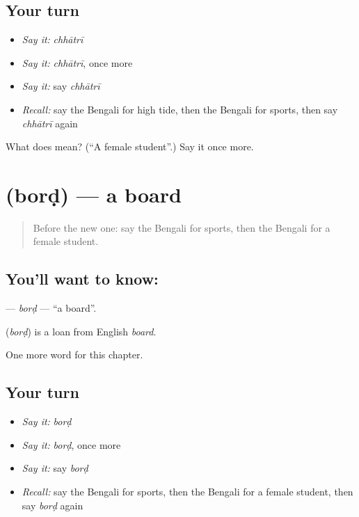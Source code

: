 \subsection*{Your turn}
\begin{itemize}
\raggedright
  \item \emph{Say it:} \emph{chhātrī}
  \item \emph{Say it:} \emph{chhātrī}, once more
  \item \emph{Say it:} say \emph{chhātrī}
  \item \emph{Recall:} say the Bengali for high tide, then the Bengali for sports, then say \emph{chhātrī} again
\end{itemize}

\begin{tcolorbox}[breakable,colback=teal!4,colframe=teal!35!black,title={Before you move on}]
What does  mean? (\textquotedblleft{}A female student\textquotedblright{}.) Say it once more.
\end{tcolorbox}
\section[\texorpdfstring{\bn{বোর্ড} (borḍ)}{বোর্ড (borḍ)}]{ (borḍ) — a board}

\label{lesson:BN-C172-bord}



\begin{quote}
Before the new one: say the Bengali for sports, then the Bengali for a female student.
\end{quote}

\subsection*{You'll want to know: }
\textbf{} — \emph{borḍ} — \textquotedblleft{}a board\textquotedblright{}.

\begin{cousinweb}
\textbf{} (\emph{borḍ}) is a loan from English \emph{board}.
\end{cousinweb}

\begin{grammarlens}[title={What you've built}]
One more word for this chapter.
\end{grammarlens}

\subsection*{Your turn}
\begin{itemize}
\raggedright
  \item \emph{Say it:} \emph{borḍ}
  \item \emph{Say it:} \emph{borḍ}, once more
  \item \emph{Say it:} say \emph{borḍ}
  \item \emph{Recall:} say the Bengali for sports, then the Bengali for a female student, then say \emph{borḍ} again
\end{itemize}

